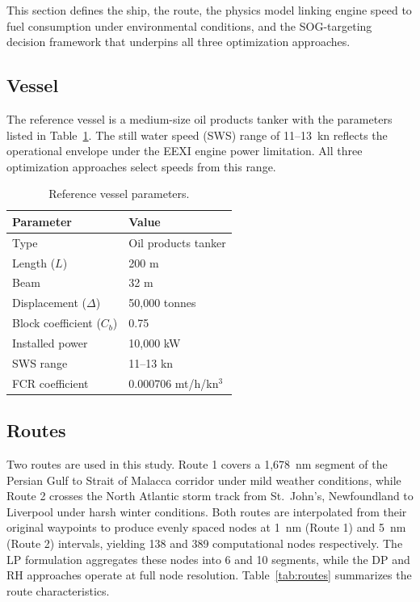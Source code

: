 \documentclass[review,authoryear]{elsarticle}  %
\begin{document}
This section defines the ship, the route, the physics model linking engine speed to fuel consumption under environmental conditions, and the SOG-targeting decision framework that underpins all three optimization approaches.

\subsection{Vessel}
\label{sec:vessel}

The reference vessel is a medium-size oil products tanker with the parameters listed in Table~\ref{tab:ship}. The still water speed (SWS) range of 11--13~kn reflects the operational envelope under the EEXI engine power limitation. All three optimization approaches select speeds from this range.

\begin{table}[htbp]
\centering
\caption{Reference vessel parameters.}
\label{tab:ship}
\begin{tabular}{ll}
\toprule
Parameter & Value \\
\midrule
Type & Oil products tanker \\
Length ($L$) & 200 m \\
Beam & 32 m \\
Displacement ($\Delta$) & 50,000 tonnes \\
Block coefficient ($C_b$) & 0.75 \\
Installed power & 10,000 kW \\
SWS range & 11--13 kn \\
FCR coefficient & 0.000706 mt/h/kn$^3$ \\
\bottomrule
\end{tabular}
\end{table}

\subsection{Routes}
\label{sec:routes}

Two routes are used in this study. Route 1 covers a 1,678~nm segment of the Persian Gulf to Strait of Malacca corridor under mild weather conditions, while Route 2 crosses the North Atlantic storm track from St.\ John's, Newfoundland to Liverpool under harsh winter conditions. Both routes are interpolated from their original waypoints to produce evenly spaced nodes at 1~nm (Route 1) and 5~nm (Route 2) intervals, yielding 138 and 389 computational nodes respectively. The LP formulation aggregates these nodes into 6 and 10 segments, while the DP and RH approaches operate at full node resolution. Table~\ref{tab:routes} summarizes the route characteristics.
\end{document}
